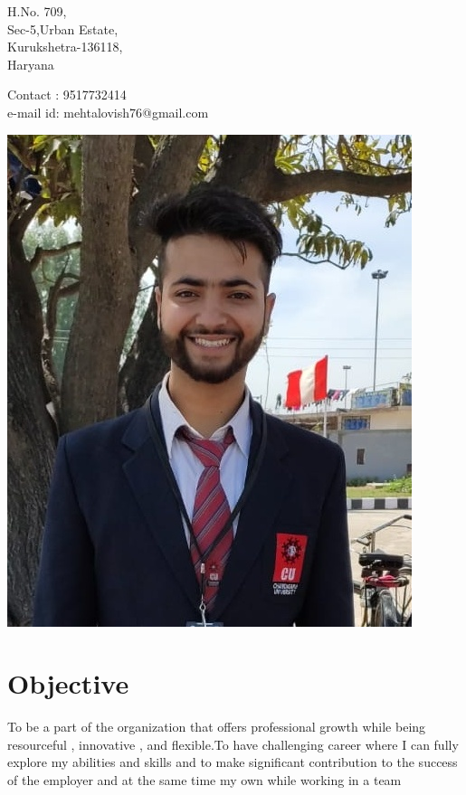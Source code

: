 \documentclass[11pt]{article}
\begin{document}
\noindent\begin{minipage}{0.5\textwidth}      
\begin{flushleft}
H.No. 709, \\                                      %
Sec-5,Urban Estate,\\
Kurukshetra-136118,\\
Haryana
\end{flushleft}
\end{minipage}
\noindent\begin{minipage}{0.5\textwidth}
\begin{flushright}                                 %
     Contact  : 9517732414\\
e-mail id: mehtalovish76@gmail.com\\
\end{flushright}
\end{minipage}

\begin{flushright}
\includegraphics[scale=0.18]{profile.jpeg}      %
\end{flushright}

\section{Objective}
To be a part of the organization that offers professional growth while being resourceful , innovative , and flexible.To have challenging career where I can fully explore my abilities and skills and to make significant contribution to the success of the employer and at the same time my own while working in a team\\
\end{document}
